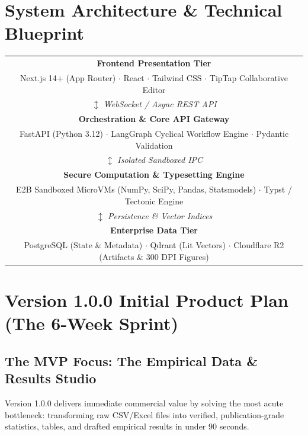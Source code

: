 \documentclass[11pt,a4paper]{article}
\begin{document}
\vspace{1em}

\section{System Architecture \& Technical Blueprint}

\begin{center}
\begin{tabular}{|c|}
\hline
\textbf{Frontend Presentation Tier}\\
Next.js 14+ (App Router) $\cdot$ React $\cdot$ Tailwind CSS $\cdot$ TipTap Collaborative Editor\\
\hline
$\updownarrow$ \textit{WebSocket / Async REST API}\\
\hline
\textbf{Orchestration \& Core API Gateway}\\
FastAPI (Python 3.12) $\cdot$ LangGraph Cyclical Workflow Engine $\cdot$ Pydantic Validation\\
\hline
$\updownarrow$ \textit{Isolated Sandboxed IPC}\\
\hline
\textbf{Secure Computation \& Typesetting Engine}\\
E2B Sandboxed MicroVMs (NumPy, SciPy, Pandas, Statsmodels) $\cdot$ Typst / Tectonic Engine\\
\hline
$\updownarrow$ \textit{Persistence \& Vector Indices}\\
\hline
\textbf{Enterprise Data Tier}\\
PostgreSQL (State \& Metadata) $\cdot$ Qdrant (Lit Vectors) $\cdot$ Cloudflare R2 (Artifacts \& 300 DPI Figures)\\
\hline
\end{tabular}
\end{center}

\newpage

\section{Version 1.0.0 Initial Product Plan (The 6-Week Sprint)}

\subsection{The MVP Focus: The Empirical Data \& Results Studio}
Version 1.0.0 delivers immediate commercial value by solving the most acute bottleneck: transforming raw CSV/Excel files into verified, publication-grade statistics, tables, and drafted empirical results in under 90 seconds.
\end{document}
